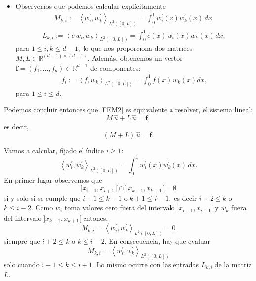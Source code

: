 \documentclass[10pt,handout]{beamer}
\theoremstyle{plain} %
\theoremstyle{plain} %
\theoremstyle{plain} %
\theoremstyle{plain} %
\theoremstyle{definition}
\theoremstyle{example}
\theoremstyle{example}
\theoremstyle{remark}
\theoremstyle{remark}
\begin{document}
\begin{frame}
\begin{itemize}
\item Observemos que podemos calcular explícitamente
\begin{align*}
M_{k,i}:= \left\langle  w_i^{\prime} , w_k^{\prime} \right\rangle_{L^2([0,L])} = \int_0^1 w_i^{\prime}(x) w_k^{\prime}(x) \, dx,
\end{align*}
\begin{align*}
L_{k,i}:= \left\langle  c\,w_i, w_{k} \right\rangle_{L^2([0,L])} = \int_0^1 c(x) \, w_i(x) w_k(x) \, dx,
\end{align*}
para $1 \le i,k \le d-1,$ lo que nos proporciona dos matrices $M,L \in \mathbb{R}^{(d-1) \times (d-1)}.$
Además, obtenemos un vector $\mathbf{f} = (f_1,\ldots,f_d) \in \mathbb{R}^{d-1}$ de componentes:
\begin{align*}
f_i := \left\langle f, w_{k} \right\rangle_{L^2([0,L])} = \int_0^1 f(x)\, w_k(x) dx,
\end{align*} 
para $1 \le i \le d.$
\end{itemize}
\end{frame}

\begin{frame}
Podemos concluir entonces que \eqref{FEM2} es equivalente a resolver, el sistema lineal:
$$
M  \, \widehat{u} + L \, \widehat{u} = \mathbf{f},
$$
es decir,
\begin{equation}
(M+L)\,\widehat{u} =  \mathbf{f}. \label{FEM3}
\end{equation}
\end{frame}

\begin{frame}
Vamos a calcular, fijado el índice $i \ge 1:$
$$
\left\langle  w_i^{\prime} , w_k^{\prime} \right\rangle_{L^2([0,L])} = \int_0^1 w_i^{\prime}(x) w_k^{\prime}(x) \, dx.
$$
En primer lugar observemos que
$$
]x_{i-1},x_{i+1}[ \cap ]x_{k-1},x_{k+1}[ = \emptyset
$$
si y solo si se cumple que $i+1 \le k-1$ o $k+1 \le i-1,$ es decir
$i+2 \le k$ o $k \le i-2.$ Como $w_i$ toma valores cero fuera del intervalo $]x_{i-1},x_{i+1}[$
y $w_k$ fuera del intervalo $]x_{k-1},x_{k+1}[$ entones,
$$
M_{k,i} = \left\langle  w_i^{\prime} , w_k^{\prime} \right\rangle_{L^2([0,L])} = 0
$$
siempre que $i+2 \le k$ o $k \le i-2.$ En consecuencia, hay que evaluar 
$$
M_{k,i} = \left\langle  w_i^{\prime} , w_k^{\prime} \right\rangle_{L^2([0,L])}
$$
solo cuando $i-1 \le k \le i+1.$ Lo mismo ocurre con las entradas $L_{k,i}$ de la matriz $L.$
\end{frame}
\end{document}
